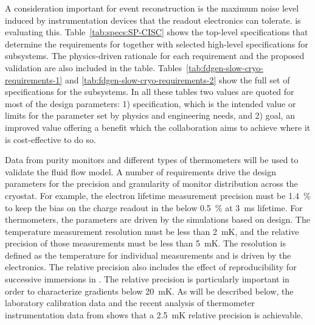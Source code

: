 A consideration important for event reconstruction is the maximum noise level induced by instrumentation devices that the readout electronics  can tolerate.  is evaluating this. 
Table~\ref{tab:specs:SP-CISC} shows the top-level specifications that determine the requirements for  together with selected high-level specifications for  subsystems. The physics-driven rationale for each requirement and the proposed validation are also included in the table.
Tables~\ref{tab:fdgen-slow-cryo-requirements-1} and \ref{tab:fdgen-slow-cryo-requirements-2} show the full set of specifications 
for the  subsystems. In all these tables two values are quoted for most of the design parameters: 
 1) specification, which is the intended value or limits for the parameter set by physics and engineering needs, and 2) goal, an improved value offering a benefit which the collaboration aims to achieve where it is cost-effective to do so.

Data from purity monitors and different types of thermometers will be used to validate the  fluid flow model. 
A number of requirements drive the design parameters for the precision and granularity of monitor distribution across the cryostat. 
For example, the electron lifetime measurement precision must be \SI{1.4}{\%} to keep the bias on the charge readout in the  below \SI{0.5}{\%} at \SI{3}{ms} lifetime. For thermometers, the %
parameters are driven by the  simulations based on  design.
The temperature measurement resolution must be less than \SI{2}{mK}, and the relative precision of those measurements must be less than \SI{5}{mK}. The resolution is defined as the temperature   for individual measurements and is driven by the electronics. The relative precision also includes the effect of reproducibility for successive immersions in . 
The relative precision is particularly important in order to characterize %
gradients below \SI{20}{mK}. %
As will be described below, the laboratory calibration data and the recent analysis of thermometer instrumentation data from  shows that a \SI{2.5}{mK} relative precision is achievable. 

